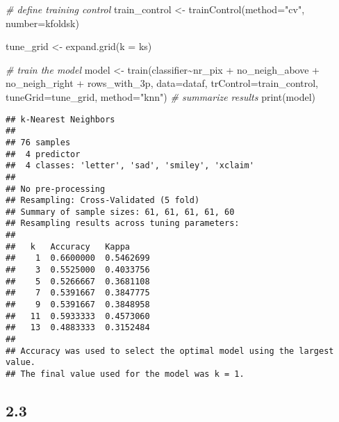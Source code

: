 \documentclass[
]{article}
\newenvironment{Shaded}{\begin{snugshade}}{\end{snugshade}}
\newcommand{\AttributeTok}[1]{\textcolor[rgb]{0.77,0.63,0.00}{#1}}
\newcommand{\CommentTok}[1]{\textcolor[rgb]{0.56,0.35,0.01}{\textit{#1}}}
\newcommand{\FloatTok}[1]{\textcolor[rgb]{0.00,0.00,0.81}{#1}}
\newcommand{\FunctionTok}[1]{\textcolor[rgb]{0.00,0.00,0.00}{#1}}
\newcommand{\NormalTok}[1]{#1}
\newcommand{\OtherTok}[1]{\textcolor[rgb]{0.56,0.35,0.01}{#1}}
\newcommand{\SpecialCharTok}[1]{\textcolor[rgb]{0.00,0.00,0.00}{#1}}
\newcommand{\StringTok}[1]{\textcolor[rgb]{0.31,0.60,0.02}{#1}}
\begin{document}
\begin{Shaded}
\begin{Highlighting}[]
\CommentTok{\# define training control}
\NormalTok{train\_control }\OtherTok{\textless{}{-}} \FunctionTok{trainControl}\NormalTok{(}\AttributeTok{method=}\StringTok{"cv"}\NormalTok{, }\AttributeTok{number=}\NormalTok{kfoldsk)}

\NormalTok{tune\_grid }\OtherTok{\textless{}{-}} \FunctionTok{expand.grid}\NormalTok{(}\AttributeTok{k =}\NormalTok{ ks)}

\CommentTok{\# train the model}
\NormalTok{model }\OtherTok{\textless{}{-}} \FunctionTok{train}\NormalTok{(classifier}\SpecialCharTok{\textasciitilde{}}\NormalTok{nr\_pix }\SpecialCharTok{+}\NormalTok{ no\_neigh\_above }\SpecialCharTok{+}\NormalTok{ no\_neigh\_right }\SpecialCharTok{+}\NormalTok{ rows\_with\_3p, }\AttributeTok{data=}\NormalTok{dataf, }
               \AttributeTok{trControl=}\NormalTok{train\_control, }\AttributeTok{tuneGrid=}\NormalTok{tune\_grid, }\AttributeTok{method=}\StringTok{"knn"}\NormalTok{)}
\CommentTok{\# summarize results}
\FunctionTok{print}\NormalTok{(model)}
\end{Highlighting}
\end{Shaded}

\begin{verbatim}
## k-Nearest Neighbors 
## 
## 76 samples
##  4 predictor
##  4 classes: 'letter', 'sad', 'smiley', 'xclaim' 
## 
## No pre-processing
## Resampling: Cross-Validated (5 fold) 
## Summary of sample sizes: 61, 61, 61, 61, 60 
## Resampling results across tuning parameters:
## 
##   k   Accuracy   Kappa    
##    1  0.6600000  0.5462699
##    3  0.5525000  0.4033756
##    5  0.5266667  0.3681108
##    7  0.5391667  0.3847775
##    9  0.5391667  0.3848958
##   11  0.5933333  0.4573060
##   13  0.4883333  0.3152484
## 
## Accuracy was used to select the optimal model using the largest value.
## The final value used for the model was k = 1.
\end{verbatim}

\begin{Shaded}
\end{Shaded}

\hypertarget{section-4}{%
\subsection{2.3}\label{section-4}}
\end{document}
